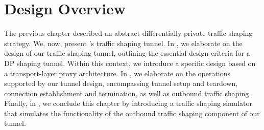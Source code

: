 \chapter{Design Overview}\label{ch:design}
The previous chapter described an abstract differentially private traffic shaping strategy.
We, now, present \sys's traffic shaping tunnel.
In , we elaborate on the design of our traffic shaping tunnel,  outlining the essential design criteria for a DP shaping tunnel.
Within this context, we introduce a specific design based on a transport-layer proxy architecture.
In , we elaborate on the operations supported by our tunnel design, encompassing tunnel setup and teardown, connection establishment and termination, as well as outbound traffic shaping.
Finally, in , we conclude this chapter by introducing a traffic shaping simulator that simulates the functionality of the outbound traffic shaping component of our tunnel.



